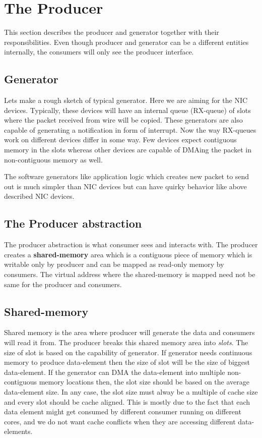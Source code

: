 \documentclass[a4paper,twoside]{report} %
\begin{document}
\section{The Producer}
This section describes the producer and generator together with
their responsibilities.  Even though producer and generator can
be a different entities internally, the consumers will only see
the producer interface.

\subsection{Generator}
Lets make a rough sketch of typical generator.  Here we are aiming
for the NIC devices.  Typically, these devices will have an
internal queue (RX-queue) of slots where the packet received
from wire will be copied.  These generators are also capable
of generating a notification in form of interrupt.  Now the
way RX-queues work on different devices differ in some way.
Few devices expect contiguous memory in the slots whereas
other devices are capable of DMAing the packet in non-contiguous
memory as well.

	
The software generators like application
logic which creates new packet to send out is much simpler than
NIC devices but can have quirky behavior like above described
NIC devices.


\subsection{The Producer abstraction}
The producer abstraction is what consumer sees and interacts with.
The producer creates a 
\textbf{shared-memory} area which is a contiguous piece of memory
which is writable only by producer and can be mapped as read-only
memory by consumers.  The virtual address where the shared-memory
is mapped need not be same for the producer and consumers.

\subsection{Shared-memory}
Shared memory is the area where producer will generate the data
and consumers will read it from. The producer breaks this
shared memory area into \textit{slots}.  The size of slot
is based on the capability of generator.  If generator needs
continuous memory to produce data-element then the size of
slot will be the size of biggest data-element.  If the
generator can DMA the data-element into multiple non-contiguous
memory locations then, the slot size should be based on
the average data-element size.  In any case, the slot size
must alway be a multiple of cache size and every slot should
be cache aligned.  This is mostly due to the fact that each
data element might get consumed by different consumer running
on different cores, and we do not want cache conflicts when
they are accessing different data-elements.
\end{document}

